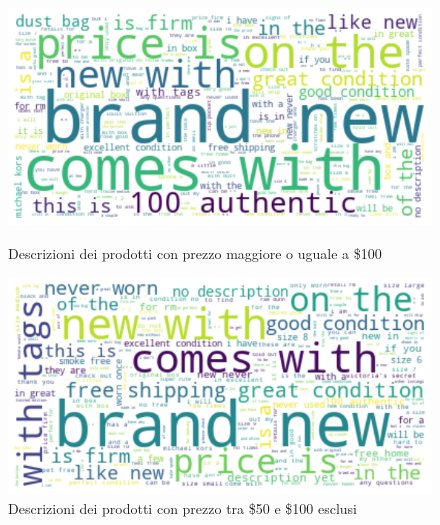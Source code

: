 \begin{figure}[H]
   \begin{minipage}{0.48\textwidth}
     \centering
     \includegraphics[width=.9\linewidth]{maggiore_100}
	\caption{Descrizioni dei prodotti con prezzo maggiore o uguale a \$100}
	\label{fig:100}   
	\end{minipage}\hfill
   \begin{minipage}{0.48\textwidth}
     \centering
     \includegraphics[width=.9\linewidth]{50_100}
     \caption{Descrizioni dei prodotti con prezzo tra \$50 e \$100 esclusi}
     \label{Fig:50_100}
   \end{minipage}
\end{figure}

